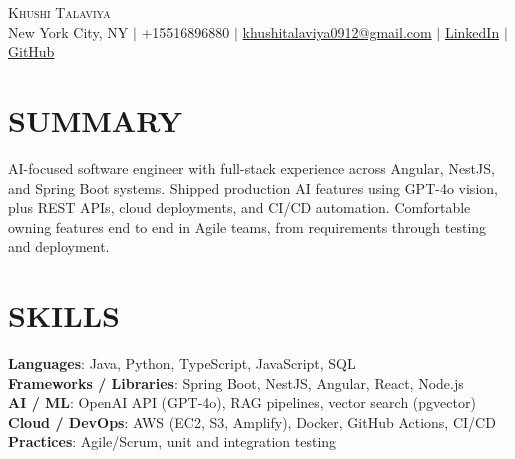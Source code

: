 \documentclass[letterpaper,11pt]{article}
\begin{document}
\begin{center}
    {\Huge \scshape Khushi Talaviya} \\ \vspace{2pt}
    \vspace{4pt}
    \small
    New York City, NY $|$
    \small
    +15516896880 $|$
    \href{mailto:khushitalaviya0912@gmail.com}{khushitalaviya0912@gmail.com} $|$
    \href{https://www.linkedin.com/in/khushitalaviya/}{LinkedIn} $|$
    \href{https://github.com/talaviyakhushi}{GitHub}
\end{center}

\section{SUMMARY}
\vspace{5pt}
\small{AI-focused software engineer with full-stack experience across Angular, NestJS, and Spring Boot systems. Shipped production AI features using GPT-4o vision, plus REST APIs, cloud deployments, and CI/CD automation. Comfortable owning features end to end in Agile teams, from requirements through testing and deployment.}

\vspace{2pt}
\section{SKILLS}
\vspace{5pt}
\begin{itemize}[leftmargin=0in, label={}]
\small{\item{
\textbf{Languages}{: Java, Python, TypeScript, JavaScript, SQL} \\
\textbf{Frameworks / Libraries}{: Spring Boot, NestJS, Angular, React, Node.js} \\
\textbf{AI / ML}{: OpenAI API (GPT-4o), RAG pipelines, vector search (pgvector)} \\
\textbf{Cloud / DevOps}{: AWS (EC2, S3, Amplify), Docker, GitHub Actions, CI/CD} \\
\textbf{Practices}{: Agile/Scrum, unit and integration testing}
}}
\end{itemize}
\vspace{-10pt}

\end{document}
